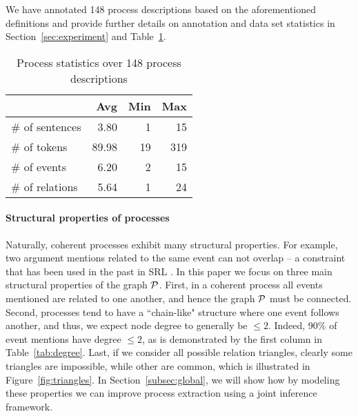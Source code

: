 We have annotated 148 process descriptions based on the aforementioned definitions and provide further details on annotation and data set statistics in Section~\ref{sec:experiment} and Table~\ref{tab:datastats}.

\begin{table}[t]
{\footnotesize
\hfill{}
\begin{tabular}{|l|r|r|r|}
\hline
&\textbf{Avg}&\textbf{Min} & \textbf{Max}\\
\hline
\# of sentences            &     3.80       &    1        &   15 \\ 
\# of tokens            &     89.98        &   19        & 319  \\ 
\# of events                &   6.20         &       2   &  15  \\ 
\# of relations          &     5.64       &      1        &  24 \\ 
\hline
\end{tabular}}
\hfill{}
\caption{Process statistics over 148 process descriptions}
\label{tab:datastats}
\end{table}

\paragraph{Structural properties of processes} 
Naturally, coherent processes exhibit many structural properties. For example, two argument mentions related to the same event can not overlap -- a constraint that has been used in the past in SRL \cite{Toutanova08}. In this paper we focus on three main structural properties of the graph $\mathcal{P}$. First, in a coherent process all events mentioned are related to one another, and hence the graph $\mathcal{P}$ must be connected. Second, processes tend to have a ``chain-like" structure where one event follows another, and thus, we expect node degree to generally be $\leq 2$. Indeed, 90\% of event mentions have degree $\leq2$, as is demonstrated by the first column in Table~\ref{tab:degree}. Last, if we consider all possible relation triangles, clearly some triangles are impossible, while other are common, which is illustrated in Figure~\ref{fig:triangles}. In Section~\ref{subsec:global}, we will show how by modeling these properties we can improve process extraction using a joint inference framework.

